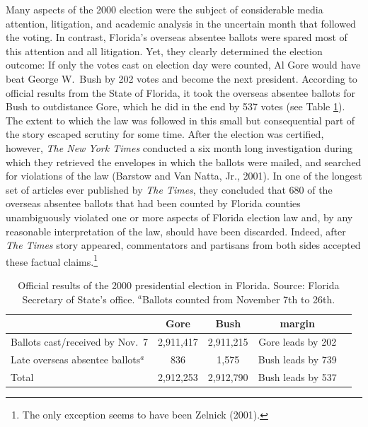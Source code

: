 \documentclass[11pt,titlepage]{article}
\begin{document}
Many aspects of the 2000 election were the subject of considerable
media attention, litigation, and academic analysis in the uncertain
month that followed the voting.
In contrast, Florida's overseas absentee ballots were spared most of
this attention and all litigation.  Yet, they clearly determined the
election outcome: If only the votes cast on election day were counted,
Al Gore would have beat George W.\ Bush by 202 votes and become the
next president.  According to official results from the State of
Florida, it took the overseas absentee ballots for Bush to outdistance
Gore, which he did in the end by 537 votes (see Table
\ref{tb:official}).  The extent to which the law was followed in this
small but consequential part of the story escaped scrutiny for some
time. After the election was certified, however, \emph{The New York
  Times} conducted a six month long investigation during which they
retrieved the envelopes in which the ballots were mailed, and searched
for violations of the law (Barstow and Van Natta, Jr., 2001).  In one
of the longest set of articles ever published by \emph{The Times},
they concluded that 680 of the overseas absentee ballots that had been
counted by Florida counties unambiguously violated one or more aspects
of Florida election law and, by any reasonable interpretation of the
law, should have been discarded.  Indeed, after \emph{The Times} story
appeared, commentators and partisans from both sides accepted these
factual claims.\footnote{The only exception seems to have been Zelnick
  (2001)\nocite{Zelnick01}.}
\begin{table}[t]
\begin{center}
\begin{tabular}{lcccc}
                               & Gore      & Bush      & margin \\ \hline 
Ballots cast/received by Nov.\ 7&2,911,417 & 2,911,215 & Gore leads by 202 \\
Late overseas absentee ballots$^a$ &   836 &     1,575 & Bush leads by 739 \\
\hline
Total                          & 2,912,253 & 2,912,790 & Bush leads by 537 \\
\end{tabular} \caption{Official results of the 2000 presidential
  election in Florida.  Source: Florida Secretary of State's office.
  $^a$Ballots counted from November 7th to 26th.}
\label{tb:official}
\end{center}
\end{table} 
\end{document}
